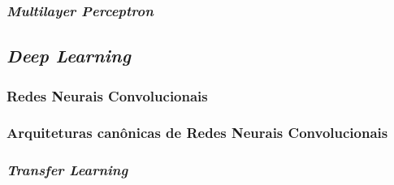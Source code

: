 

\subsubsection{\emph{Multilayer Perceptron}}
\label{subsubsec:mlp}


\subsection{\emph{Deep Learning}}
\label{subsec:dl}

\subsubsection{Redes Neurais Convolucionais}
\label{subsubsec:cnns}

\subsubsection{Arquiteturas canônicas de Redes Neurais Convolucionais}
\label{subsubsec:arq-cnns}

\subsubsection{\emph{Transfer Learning}}
\label{subsubsec:transfer}

